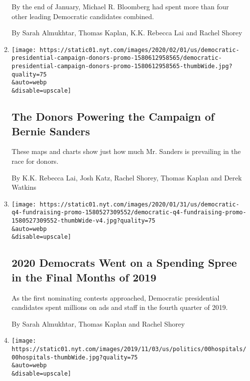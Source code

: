 \begin{enumerate}
  By the end of January, Michael R. Bloomberg had spent more than four
  other leading Democratic candidates combined.

  By Sarah Almukhtar, Thomas Kaplan, K.K. Rebecca Lai and Rachel Shorey
\item
  \href{/interactive/2020/02/01/us/politics/democratic-presidential-campaign-donors.html}{}

  \texttt{[image: https://static01.nyt.com/images/2020/02/01/us/democratic-presidential-campaign-donors-promo-1580612958565/democratic-presidential-campaign-donors-promo-1580612958565-thumbWide.jpg?quality=75\\\&auto=webp\\\&disable=upscale]}

  \hypertarget{the-donors-powering-the-campaign-of-bernie-sanders}{%
  \subsection{The Donors Powering the Campaign of Bernie
  Sanders}\label{the-donors-powering-the-campaign-of-bernie-sanders}}

  These maps and charts show just how much Mr. Sanders is prevailing in
  the race for donors.

  By K.K. Rebecca Lai, Josh Katz, Rachel Shorey, Thomas Kaplan and Derek
  Watkins
\item
  \href{/interactive/2020/02/01/us/elections/democratic-q4-fundraising.html}{}

  \texttt{[image: https://static01.nyt.com/images/2020/01/31/us/democratic-q4-fundraising-promo-1580527309552/democratic-q4-fundraising-promo-1580527309552-thumbWide-v4.jpg?quality=75\\\&auto=webp\\\&disable=upscale]}

  \hypertarget{2020-democrats-went-on-a-spending-spree-in-the-final-months-of-2019}{%
  \subsection{2020 Democrats Went on a Spending Spree in the Final
  Months of
  2019}\label{2020-democrats-went-on-a-spending-spree-in-the-final-months-of-2019}}

  As the first nominating contests approached, Democratic presidential
  candidates spent millions on ads and staff in the fourth quarter of
  2019.

  By Sarah Almukhtar, Thomas Kaplan and Rachel Shorey
\item
  \href{/2019/11/08/us/hospitals-lawsuits-medical-debt.html}{}

  \texttt{[image: https://static01.nyt.com/images/2019/11/03/us/politics/00hospitals/00hospitals-thumbWide.jpg?quality=75\\\&auto=webp\\\&disable=upscale]}


\end{enumerate}

